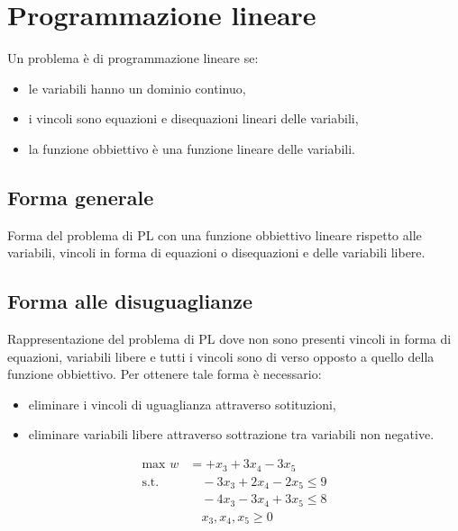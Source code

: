 \chapter{Programmazione lineare}

Un problema è di programmazione lineare se:

\begin{itemize}
    \item le variabili hanno un dominio continuo,
    \item i vincoli sono equazioni e disequazioni lineari delle variabili,
    \item la funzione obbiettivo è una funzione lineare delle variabili.
\end{itemize}

\section{Forma generale}
Forma del problema di PL con una funzione obbiettivo lineare rispetto alle variabili, vincoli in forma di equazioni o disequazioni e delle variabili libere. 

\section{Forma alle disuguaglianze}
Rappresentazione del problema di PL dove non sono presenti vincoli in forma di equazioni, variabili libere e tutti i vincoli sono di verso opposto a quello della funzione obbiettivo.
Per ottenere tale forma è necessario:
\begin{itemize}
	\item eliminare i vincoli di uguaglianza attraverso sotituzioni,
	\item eliminare variabili libere attraverso sottrazione tra variabili non negative.
\end{itemize}

\begin{equation} \label{esFormaDis}
	\begin{split}
		\text{max } w& = +x_3 +3x_4 -3x_5\\
		\text{s.t. } & \quad -3x_3 +2x_4 -2x_5 \le 9 \\
		& \quad  -4x_3 -3x_4 +3x_5 \le 8\\
		& \quad x_3, x_4, x_5 \ge 0
	\end{split}
\end{equation}

